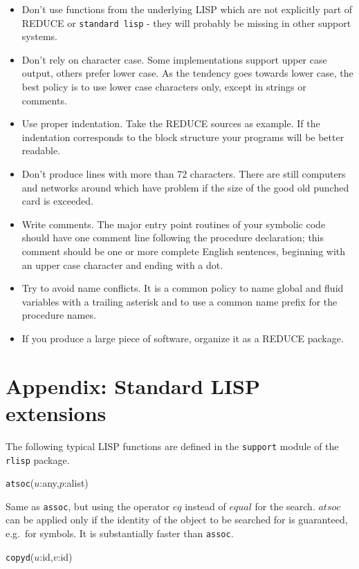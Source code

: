 \documentclass[11pt]{article}
\newcommand{\reduce}{\small REDUCE}
\begin{document}
\begin{itemize}
\item Don't use functions from the underlying LISP which are
  not explicitly part of {\reduce} or {\tt standard lisp}
  - they will probably be missing in other support systems.
\item Don't rely on character case. 
  Some implementations support upper case
  output, others prefer lower case. As the tendency goes
  towards lower case, the best policy is to use lower
  case characters only, except in strings or comments.
\item Use proper indentation. Take the {\reduce}
  sources as example. If the indentation corresponds
  to the block structure your programs will be better
  readable.
\item Don't produce lines with more than 72 characters.
  There are still computers and networks around which
  have problem if the size of the good old punched card
  is exceeded.
\item Write comments. The major entry point routines of your
  symbolic code should have one comment line following the
  procedure declaration; this comment should be one or more
  complete English sentences, beginning with an upper case
  character and ending with a dot.
\item Try to avoid name conflicts. It is a common policy to
  name global and fluid variables with a trailing asterisk
  and to use a common name prefix for the procedure names.
\item If you produce a large piece of software, organize it as
  a {\reduce} package.
\end{itemize}

 
\section{Appendix: Standard LISP extensions}

The following typical LISP functions are defined in the {\tt support}
module of the {\tt rlisp}  package.

\vspace{5mm}    
{\tt atsoc}($u$:any,$p$:alist)

\noindent
Same as {\tt assoc}, but using the operator $eq$ instead of $equal$
for the search. $atsoc$ can be applied only if the identity
of the object to be searched for is guaranteed, e.g.\  for symbols.
It is substantially faster than {\tt assoc}.

\vspace{5mm}    
{\tt copyd}($u$:id,$v$:id)
\end{document}
